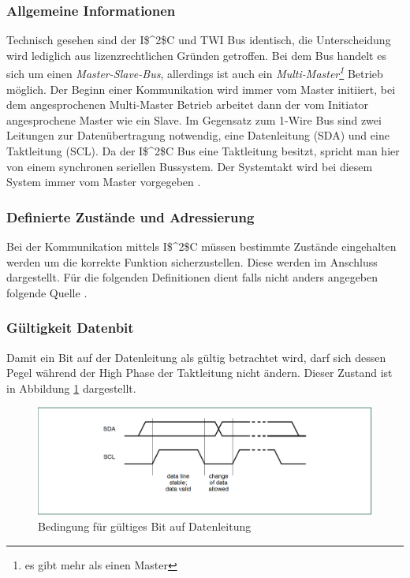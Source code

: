\subsubsection*{Allgemeine Informationen}
\label{subsubsection_Allgemeine_Informationen_I2C}
Technisch gesehen sind der \ac{I$^2$C} und \ac{TWI} Bus identisch, die Unterscheidung wird lediglich aus lizenzrechtlichen Gründen getroffen. Bei dem Bus handelt es sich um einen \textit{Master-Slave-Bus}, allerdings ist auch ein \textit{Multi-Master\footnote{es gibt mehr als einen Master}} Betrieb möglich. Der Beginn einer Kommunikation wird immer vom Master initiiert, bei dem angesprochenen Multi-Master Betrieb arbeitet dann der vom Initiator angesprochene Master wie ein Slave. Im Gegensatz zum 1-Wire Bus sind zwei Leitungen zur Datenübertragung notwendig, eine Datenleitung (SDA) und eine Taktleitung (SCL). Da der \ac{I$^2$C} Bus eine Taktleitung besitzt, spricht man hier von einem synchronen seriellen Bussystem. Der Systemtakt wird bei diesem System immer vom Master vorgegeben \citep{Bussysteme_in_der_Praxis}. 

\subsubsection*{Definierte Zustände und Adressierung}
\label{subsubsection_definierte_Zustände_Adressierung}
Bei der Kommunikation mittels \ac{I$^2$C} müssen bestimmte Zustände eingehalten werden um die korrekte Funktion sicherzustellen. Diese werden im Anschluss dargestellt. Für die folgenden Definitionen dient falls nicht anders angegeben folgende Quelle \citep{I2C_Datenblatt}.
\subsubsection*{Gültigkeit Datenbit}
\label{subsubsection_Gültigkeit_Datenbit}
Damit ein Bit auf der Datenleitung als gültig betrachtet wird, darf sich dessen Pegel während der High Phase der Taktleitung nicht ändern. Dieser Zustand ist in Abbildung \ref{Abb_Bild_I2C_data_valid} dargestellt.

\begin{figure}[!h] 
  \centering
     \includegraphics[scale=.65]{BilderAllgemein/I2C_data_valid.png}
  \caption{Bedingung für gültiges Bit auf Datenleitung \citep[S. 9]{I2C_Datenblatt}}
  \label{Abb_Bild_I2C_data_valid}
\end{figure}


